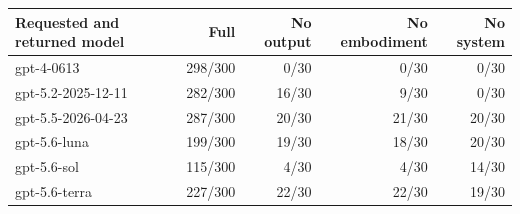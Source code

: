 \begin{tabular}{lrrrr}
\toprule
Requested and returned model & Full & No output & No embodiment & No system \\
\midrule
gpt-4-0613 & 298/300 & 0/30 & 0/30 & 0/30 \\
gpt-5.2-2025-12-11 & 282/300 & 16/30 & 9/30 & 0/30 \\
gpt-5.5-2026-04-23 & 287/300 & 20/30 & 21/30 & 20/30 \\
gpt-5.6-luna & 199/300 & 19/30 & 18/30 & 20/30 \\
gpt-5.6-sol & 115/300 & 4/30 & 4/30 & 14/30 \\
gpt-5.6-terra & 227/300 & 22/30 & 22/30 & 19/30 \\
\bottomrule
\end{tabular}
